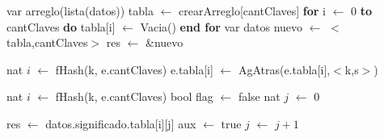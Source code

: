 \disFuncionDeAbsFuncionesAux


\newpage
\disAlgoritmos
\begin{algorithm}\phantom{[H]}
\begin{algorithmic}[1]
 
	\State var arreglo(lista(datos)) tabla $\gets$ crearArreglo[cantClaves] 
	\State \textbf{for} i $\gets$ 0 \textbf{to} cantClaves \textbf{do} 
  	\State tabla[i] $\gets$ Vacia() 
  	\State \textbf{end for}
  	\State var datos nuevo $\gets$ $<$tabla,cantClaves$>$ 
  	\State res $\gets$ \&nuevo 
\EndFunction
\end{algorithmic}
\end{algorithm}

\begin{algorithm}\phantom{[H]}
\begin{algorithmic}[1]
 
    \State nat $i$ $\gets$ fHash(k, e.cantClaves) 
    \State e.tabla[i] $\gets$ AgAtras(e.tabla[i],$<$k,s$>$) 
    
\EndFunction
\end{algorithmic}
\end{algorithm}

\begin{algorithm}\phantom{[H]}
\begin{algorithmic}[1]
 
  \State nat $i$ $\gets$ fHash(k, e.cantClaves) 
  \State bool flag $\gets$ false 
  \State nat $j$ $\gets$ 0 

   
	   
      \State res $\gets$ datos.significado.tabla[i][j] 
      \State aux $\gets$ true 
      \EndIf      
      \State $j$ $\gets$ $j+1$
  \EndWhile
\EndFunction
\end{algorithmic}
\end{algorithm}




